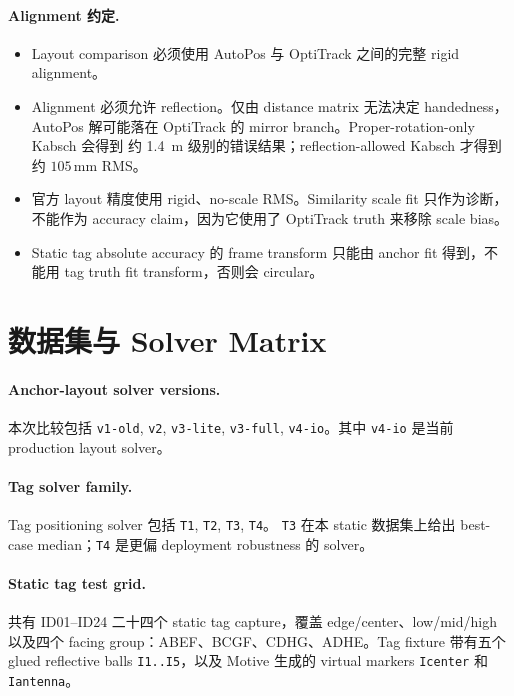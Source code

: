 \documentclass[11pt,a4paper]{article}
\newcommand{\mm}{\,\si{\milli\meter}}
\begin{document}
\paragraph{Alignment 约定.}
\begin{itemize}[leftmargin=1.4em]
  \item Layout comparison 必须使用 AutoPos 与 OptiTrack 之间的完整 rigid alignment。
  \item Alignment 必须允许 reflection。仅由 distance matrix 无法决定 handedness，
        AutoPos 解可能落在 OptiTrack 的 mirror branch。Proper-rotation-only Kabsch 会得到
        约 \SI{1.4}{\meter} 级别的错误结果；reflection-allowed Kabsch 才得到约
        $105\mm$ RMS。
  \item 官方 layout 精度使用 rigid、no-scale RMS。Similarity scale fit 只作为诊断，
        不能作为 accuracy claim，因为它使用了 OptiTrack truth 来移除 scale bias。
  \item Static tag absolute accuracy 的 frame transform 只能由 anchor fit 得到，不能用
        tag truth fit transform，否则会 circular。
\end{itemize}

\section{数据集与 Solver Matrix}

\paragraph{Anchor-layout solver versions.}
本次比较包括 \texttt{v1-old}, \texttt{v2}, \texttt{v3-lite}, \texttt{v3-full},
\texttt{v4-io}。其中 \texttt{v4-io} 是当前 production layout solver。

\paragraph{Tag solver family.}
Tag positioning solver 包括 \texttt{T1}, \texttt{T2}, \texttt{T3}, \texttt{T4}。
\texttt{T3} 在本 static 数据集上给出 best-case median；\texttt{T4} 是更偏 deployment
robustness 的 solver。

\paragraph{Static tag test grid.}
共有 ID01--ID24 二十四个 static tag capture，覆盖 edge/center、low/mid/high 以及四个
facing group：ABEF、BCGF、CDHG、ADHE。Tag fixture 带有五个 glued reflective balls
\texttt{I1..I5}，以及 Motive 生成的 virtual markers \texttt{Icenter} 和 \texttt{Iantenna}。
\end{document}
